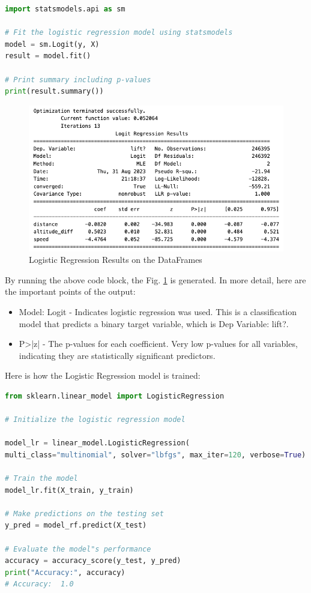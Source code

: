 \begin{lstlisting}[language=Python]
import statsmodels.api as sm

# Fit the logistic regression model using statsmodels
model = sm.Logit(y, X)
result = model.fit()

# Print summary including p-values
print(result.summary())
\end{lstlisting}
\begin{figure}[ht]
	\includegraphics[width=\textwidth]{resources/pvalue.png}
	\caption{Logistic Regression Results on the DataFrames}
	\label{fig:pvalue}
\end{figure}



By running the above code block, the Fig. \ref{fig:pvalue} is generated. In more detail, here are the important points of the output:

\begin{itemize}
	\item Model: Logit - Indicates logistic regression was used. This is a classification model that predicts a binary target variable, which is Dep Variable: lift?.
	
	\item P>|z| - The p-values for each coefficient. Very low p-values for all variables, indicating they are statistically significant predictors.	
\end{itemize}

Here is how the Logistic Regression model is trained:
\begin{lstlisting}[language=Python]
from sklearn.linear_model import LogisticRegression

# Initialize the logistic regression model

model_lr = linear_model.LogisticRegression(
multi_class="multinomial", solver="lbfgs", max_iter=120, verbose=True)

# Train the model
model_lr.fit(X_train, y_train)

# Make predictions on the testing set
y_pred = model_rf.predict(X_test)

# Evaluate the model"s performance
accuracy = accuracy_score(y_test, y_pred)
print("Accuracy:", accuracy)
# Accuracy:  1.0
\end{lstlisting}



